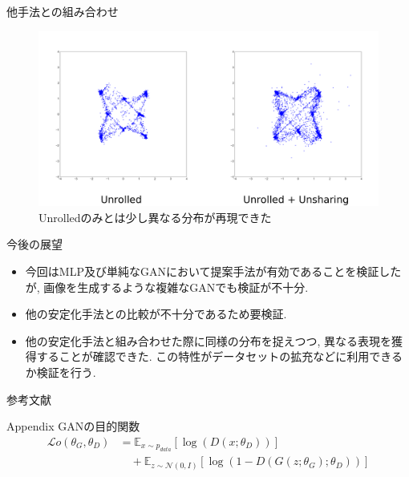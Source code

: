 \documentclass[dvipdfmx,12pt,unicode]{beamer}
\begin{document}
\begin{frame}{他手法との組み合わせ}
  \begin{figure}[htb]
    \centering        
    \includegraphics[width=\linewidth]{unrolled.png}
    \caption{Unrolledのみとは少し異なる分布が再現できた}
  \end{figure}
\end{frame}

\begin{frame}{今後の展望}
  \begin{itemize}
  \item 今回はMLP及び単純なGANにおいて提案手法が有効であることを検証したが,
    画像を生成するような複雑なGANでも検証が不十分.
  \item 他の安定化手法との比較が不十分であるため要検証.
  \item 他の安定化手法と組み合わせた際に同様の分布を捉えつつ, 異なる表現を獲得することが確認できた.
    この特性がデータセットの拡充などに利用できるか検証を行う.
  \end{itemize}
\end{frame}

\begin{frame}[allowframebreaks]{参考文献}
  \beamertemplatetextbibitems


\end{frame}

\begin{frame}{Appendix}
  GANの目的関数 \\
  \begin{equation}
    \begin{split}
    \label{gan_main}
    \mathcal{L}o(\theta_{G}, \theta_{D}) & =  \mathbb{E}_{x\sim p_{data}} [ \log(D(x; \theta_{D})) ]    \\ 
    & \quad + \mathbb{E}_{z\sim \mathcal{N}(0, I)} [ \log(1 - D(G(z;\theta_{G}); \theta_{D})) ]
    \end{split}
  \end{equation}
\end{frame}
\end{document}
